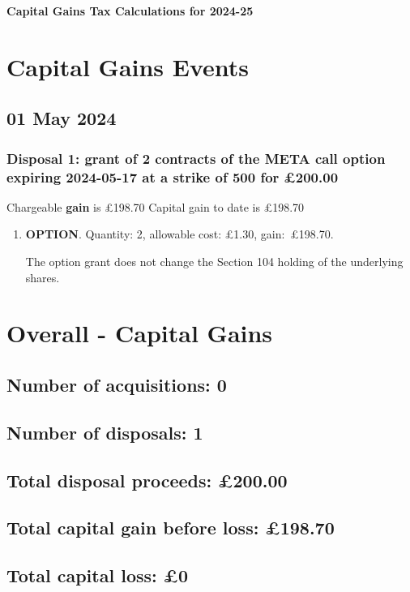 \documentclass{article}
\begin{document}
\centerline{\Large\bfseries Capital Gains Tax Calculations for 2024-25}

\section*{Capital Gains Events}


\subsection*{01 May 2024}
\subsubsection*{
    Disposal 1: grant of 2
    contracts of the META call option expiring 2024-05-17 at a strike of 500
    for £200.00
}
Chargeable \textbf{gain} is £198.70
Capital gain to date is £198.70

\begin{enumerate}
\item \textbf{OPTION}. Quantity: 2,
    allowable
    cost:
    £1.30,
    \mbox{gain: £198.70.}

    The option grant does not change the Section 104 holding of the underlying shares.

\end{enumerate}




\clearpage
\section*{Overall - Capital Gains}
\subsection*{Number of acquisitions: 0}
\subsection*{Number of disposals: 1}
\subsection*{Total disposal proceeds: £200.00}
\subsection*{Total capital gain before loss: £198.70}
\subsection*{Total capital loss: £0}
\end{document}
